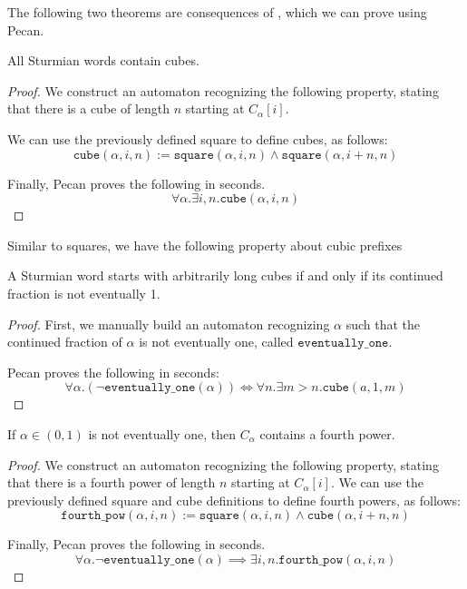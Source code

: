 The following two theorems are consequences of \autocite[Theorem 4]{DAMANIK2003377}, which we can prove using Pecan.
\begin{theorem}
    All Sturmian words contain cubes.
\end{theorem}
\begin{proof}
We construct an automaton recognizing the following property, stating that there is a cube of length $n$ starting at $C_{\alpha}[i]$.

We can use the previously defined square to define cubes, as follows:
\[
    \texttt{cube}(\alpha, i, n) := \texttt{square}(\alpha, i, n) \land \texttt{square}(\alpha, i + n, n)
\]

Finally, Pecan proves the following in  seconds.
\[
    \forall \alpha. \exists i, n. \texttt{cube}(\alpha, i, n)
\]
\end{proof}

Similar to squares, we have the following property about cubic prefixes
\begin{theorem}
    A Sturmian word starts with arbitrarily long cubes if and only if its continued fraction is not eventually 1.
\end{theorem}
\begin{proof}
First, we manually build an automaton recognizing $\alpha$ such that the continued fraction of $\alpha$ is not eventually one, called $\texttt{eventually\_one}$.

Pecan proves the following in  seconds:
\[
    \forall \alpha. 
    (\lnot \texttt{eventually\_one}(\alpha)) 
    \iff 
    \forall n.
    \exists m > n. \texttt{cube}(a, 1, m)
\]
\end{proof}

\begin{theorem}
    If $\alpha \in (0,1)$ is not eventually one, then $C_{\alpha}$ contains a fourth power.
\end{theorem}
\begin{proof}
We construct an automaton recognizing the following property, stating that there is a fourth power of length $n$ starting at $C_{\alpha}[i]$.
We can use the previously defined square and cube definitions to define fourth powers, as follows:
\[
    \texttt{fourth\_pow}(\alpha, i, n) := \texttt{square}(\alpha, i, n) \land \texttt{cube}(\alpha, i + n, n)
\]

Finally, Pecan proves the following in  seconds.
\[
    \forall \alpha. \lnot \texttt{eventually\_one}(\alpha) \implies \exists i, n. \texttt{fourth\_pow}(\alpha, i, n)
\]
\end{proof}

